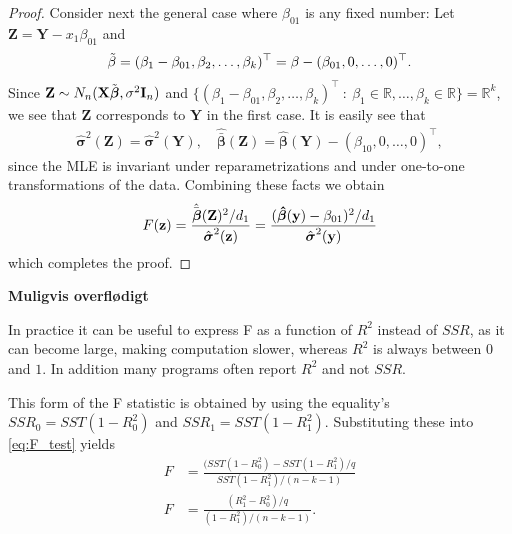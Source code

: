 \begin{proof}
    Consider next the general case where $\beta_{01}$ is any fixed number: Let $\textbf{Z} = \textbf{Y} - x_1\beta_{01}$ and
    \begin{align*}
        \Tilde{\beta} = (\beta_1 - \beta_{01}, \beta_2, \ldots, \beta_k)^\top = \beta - (\beta_{01}, 0, \ldots, 0)^\top.
    \end{align*}
    Since $\textbf{Z} \sim N_n(\textbf{X}\Tilde{\boldsymbol{\beta}}, \sigma^2\textbf{I}_n)$ and $\{ (\beta_1 - \beta_{01}, \beta_2, \ldots, \beta_k)^\top \ : \ \beta_1 \in \mathbb{R}, \ldots, \beta_k \in \mathbb{R} \} = \mathbb{R}^k$, we see that $\textbf{Z}$ corresponds to $\textbf{Y}$ in the first case.
    It is easily see that
    \begin{align*}
        \hat{\boldsymbol{\sigma}}^2(\textbf{Z}) = \hat{\boldsymbol{\sigma}}^2(\textbf{Y}), \quad \hat{\bar{\boldsymbol{\beta}}}(\textbf{Z}) = \hat{\boldsymbol{\beta}}(\textbf{Y}) - (\beta_{10}, 0, \ldots, 0)^\top,
    \end{align*}
    since the MLE is invariant under reparametrizations and under one-to-one transformations of the data.
    Combining these facts we obtain
    \begin{align*}
        F(\textbf{z}) =
        \frac{\hat{\bar{\boldsymbol{\beta}}}(\textbf{Z})^2/d_1}{\hat{\boldsymbol{\sigma}}^2(\textbf{z})} = 
        \frac{(\operatorname{\boldsymbol{\hat{\beta}}}(\textbf{y}) - \beta_{01})^2/d_1}{\hat{\boldsymbol{\sigma}}^2(\textbf{y})}
    \end{align*}
    which completes the proof.
\end{proof}
\textbf{Muligvis overflødigt}

In practice it can be useful to express F as a function of $R^2$ instead of $SSR$, as it can become large, making computation slower, whereas $R^2$ is always between $0$ and $1$. In addition many programs often report $R^2$ and not $SSR$.

This form of the F statistic is obtained by using the equality's $SSR_0 = SST(1 - R^2_0)$ and $SSR_1 = SST(1-R^2_1)$. Substituting these into \eqref{eq:F_test} yields
\begin{align}\label{eq:F_test_R}
    F &= \frac{(SST(1 - R^2_0) - SST(1-R^2_1)/q}{SST(1-R^2_1)/(n-k-1)} \nonumber \\
    F &= \frac{(R^2_1 - R^2_0)/q}{(1 - R^2_1)/(n-k-1)}.
\end{align}


